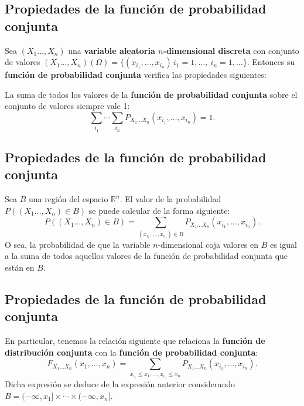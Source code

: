 \documentclass[]{book}
\begin{document}
\hypertarget{propiedades-de-la-funciuxf3n-de-probabilidad-conjunta-3}{%
\subsection{Propiedades de la función de probabilidad conjunta}\label{propiedades-de-la-funciuxf3n-de-probabilidad-conjunta-3}}

Sea \((X_1\ldots,X_n)\) una \textbf{variable aleatoria \(n\)-dimensional discreta} con conjunto de valores \((X_1\ldots,X_n)(\Omega)=\{(x_{i_1},\ldots,x_{i_n})\, i_1=1,\ldots,\ i_n=1,\ldots\}\). Entonces su \textbf{función de probabilidad conjunta} verifica las propiedades siguientes:

La suma de todos los valores de la \textbf{función de probabilidad conjunta} sobre el conjunto de valores siempre vale 1: \[\sum_{i_1}\cdots\sum_{i_n} P_{X_1\ldots X_n}(x_{i_1},\ldots,x_{i_n})=1.\]

\hypertarget{propiedades-de-la-funciuxf3n-de-probabilidad-conjunta-4}{%
\subsection{Propiedades de la función de probabilidad conjunta}\label{propiedades-de-la-funciuxf3n-de-probabilidad-conjunta-4}}

Sea \(B\) una región del espacio \(\mathbb{R}^n\). El valor de la probabilidad \(P((X_1\ldots,X_n)\in B)\) se puede calcular de la forma siguiente:
\[
P((X_1\ldots,X_n)\in B) =\sum_{(x_{i_1},\ldots,x_{i_n})\in B} P_{X_1\ldots X_n}(x_{i_1},\ldots,x_{i_n}).
\]
O sea, la probabilidad de que la variable \(n\)-dimensional coja valores en \(B\) es igual a la suma de todos aquellos valores de la función de probabilidad conjunta que están en \(B\).

\hypertarget{propiedades-de-la-funciuxf3n-de-probabilidad-conjunta-5}{%
\subsection{Propiedades de la función de probabilidad conjunta}\label{propiedades-de-la-funciuxf3n-de-probabilidad-conjunta-5}}

En particular, tenemos la relación siguiente que relaciona la \textbf{función de distribución conjunta} con la \textbf{función de probabilidad conjunta}:
\[
F_{X_1\ldots X_n}(x_1,\ldots,x_n)=\sum_{x_{i_1}\leq x_1,\ldots, x_{i_n}\leq x_n} P_{X_1\ldots X_n}(x_{i_1},\ldots,x_{i_n}).
\]
Dicha expresión se deduce de la expresión anterior considerando \(B=(-\infty,x_1]\times\cdots\times (-\infty,x_n]\).
\end{document}
